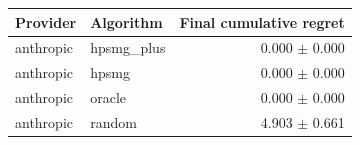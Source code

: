 \begin{tabular}{llr}
Provider & Algorithm & Final cumulative regret \\
\hline
anthropic & hpsmg_plus & 0.000 $\pm$ 0.000 \\
anthropic & hpsmg & 0.000 $\pm$ 0.000 \\
anthropic & oracle & 0.000 $\pm$ 0.000 \\
anthropic & random & 4.903 $\pm$ 0.661 \\
\end{tabular}
